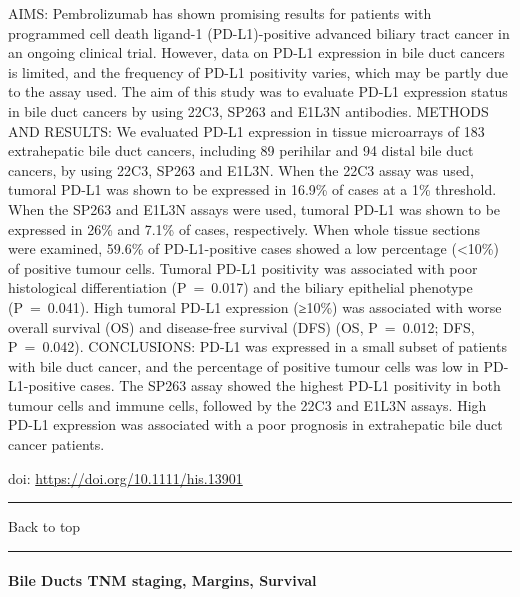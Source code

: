 \documentclass[
]{article}
\renewcommand{\linethickness}{0.05em}
\begin{document}
AIMS: Pembrolizumab has shown promising results for patients with
programmed cell death ligand-1 (PD-L1)-positive advanced biliary tract
cancer in an ongoing clinical trial. However, data on PD-L1 expression
in bile duct cancers is limited, and the frequency of PD-L1 positivity
varies, which may be partly due to the assay used. The aim of this study
was to evaluate PD-L1 expression status in bile duct cancers by using
22C3, SP263 and E1L3N antibodies. METHODS AND RESULTS: We evaluated
PD-L1 expression in tissue microarrays of 183 extrahepatic bile duct
cancers, including 89 perihilar and 94 distal bile duct cancers, by
using 22C3, SP263 and E1L3N. When the 22C3 assay was used, tumoral PD-L1
was shown to be expressed in 16.9\% of cases at a 1\% threshold. When
the SP263 and E1L3N assays were used, tumoral PD-L1 was shown to be
expressed in 26\% and 7.1\% of cases, respectively. When whole tissue
sections were examined, 59.6\% of PD-L1-positive cases showed a low
percentage (\textless10\%) of positive tumour cells. Tumoral PD-L1
positivity was associated with poor histological differentiation
(P~=~0.017) and the biliary epithelial phenotype (P~=~0.041). High
tumoral PD-L1 expression (≥10\%) was associated with worse overall
survival (OS) and disease-free survival (DFS) (OS, P~=~0.012; DFS,
P~=~0.042). CONCLUSIONS: PD-L1 was expressed in a small subset of
patients with bile duct cancer, and the percentage of positive tumour
cells was low in PD-L1-positive cases. The SP263 assay showed the
highest PD-L1 positivity in both tumour cells and immune cells, followed
by the 22C3 and E1L3N assays. High PD-L1 expression was associated with
a poor prognosis in extrahepatic bile duct cancer patients.

doi: \url{https://doi.org/10.1111/his.13901}

\begin{center}\rule{0.5\linewidth}{\linethickness}\end{center}

Back to top

\begin{center}\rule{0.5\linewidth}{\linethickness}\end{center}

\pagebreak

\hypertarget{bileducts_staging}{%
\paragraph{Bile Ducts TNM staging, Margins,
Survival}\label{bileducts_staging}}
\end{document}
